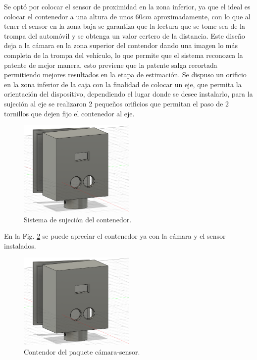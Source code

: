 Se optó por colocar el sensor de proximidad en la zona inferior, ya que el ideal es colocar el contenedor a una altura de unos $60cm$ aproximadamente, con lo que al tener el sensor en la zona baja se garantiza que la lectura que se tome sea de la trompa del automóvil y se obtenga un valor certero de la distancia. Este diseño deja a la cámara en la zona superior del contendor dando una imagen lo más completa de la trompa del vehículo, lo que permite que el sistema reconozca la patente de mejor manera, esto previene que la patente salga recortada permitiendo mejores resultados en la etapa de estimación. Se dispuso un orificio en la zona inferior de la caja con la finalidad de colocar un eje, que permita la orientación del dispositivo, dependiendo
el lugar donde se desee instalarlo, para la sujeción al eje se realizaron 2 pequeños orificios que permitan el paso de 2 tornillos que dejen fijo
el contenedor al eje.
\begin{figure}
    \centering
    \includegraphics[width=0.5\textwidth]{imgs/contenedor-camara.png}
    \caption{Sistema de sujeción del contenedor.}
    \label{fig:sujecion-contenedor}
\end{figure}

En la Fig. \ref{fig:contenedor-camara-real} se puede apreciar el contenedor ya con la cámara y el sensor instalados.

\begin{figure}
    \centering
    \includegraphics[width=0.5\textwidth]{imgs/contenedor-camara.png}
    \caption{Contendor del paquete cámara-sensor.}
    \label{fig:contenedor-camara-real}
\end{figure}

